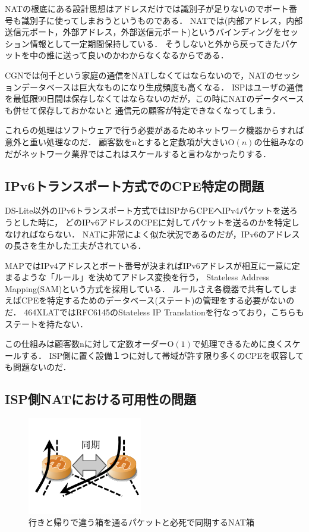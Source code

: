 NATの根底にある設計思想はアドレスだけでは識別子が足りないのでポート番号も識別子に使ってしまおうというものである．
NATでは(内部アドレス，内部送信元ポート，外部アドレス，外部送信元ポート)というバインディングをセッション情報として一定期間保持している．
そうしないと外から戻ってきたパケットを中の誰に送って良いのかわからなくなるからである．

CGNでは何千という家庭の通信をNATしなくてはならないので，NATのセッションデータベースは巨大なものになり生成頻度も高くなる．
ISPはユーザの通信を最低限90日間は保存しなくてはならないのだが，この時にNATのデータベースも併せて保存しておかないと
通信元の顧客が特定できなくなってしまう．

これらの処理はソフトウェアで行う必要があるためネットワーク機器からすれば意外と重い処理なのだ．
顧客数をnとすると定数項が大きい$\mathrm{O}(n)$の仕組みなのだがネットワーク業界ではこれはスケールすると言わなかったりする．

\subsection{IPv6トランスポート方式でのCPE特定の問題}

DS-Lite以外のIPv6トランスポート方式ではISPからCPEへIPv4パケットを送ろうとした時に，
どのIPv6アドレスのCPEに対してパケットを送るのかを特定しなければならない．
NATに非常によく似た状況であるのだが，IPv6のアドレスの長さを生かした工夫がされている．

MAPではIPv4アドレスとポート番号が決まればIPv6アドレスが相互に一意に定まるような「ルール」を決めてアドレス変換を行う，
Stateless Address Mapping(SAM)という方式を採用している．
ルールさえ各機器で共有してしまえばCPEを特定するためのデータベース(ステート)の管理をする必要がないのだ．
464XLATではRFC6145のStateless IP Translationを行なっており，こちらもステートを持たない．

この仕組みは顧客数nに対して定数オーダー$\mathrm{O}(1)$で処理できるために良くスケールする．
ISP側に置く設備１つに対して帯域が許す限り多くのCPEを収容しても問題ないのだ．

\subsection{ISP側NATにおける可用性の問題}

\begin{figure}
\centering
\includegraphics[bb=0 10 140 109,width=5cm]{./yuyarin/cgn-nat.pdf}
\caption{行きと帰りで違う箱を通るパケットと必死で同期するNAT箱}
\end{figure}

